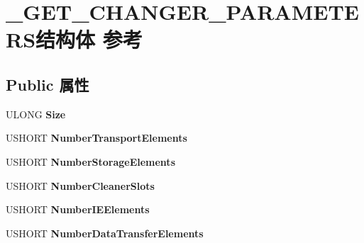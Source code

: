 \hypertarget{struct___g_e_t___c_h_a_n_g_e_r___p_a_r_a_m_e_t_e_r_s}{}\section{\+\_\+\+G\+E\+T\+\_\+\+C\+H\+A\+N\+G\+E\+R\+\_\+\+P\+A\+R\+A\+M\+E\+T\+E\+R\+S结构体 参考}
\label{struct___g_e_t___c_h_a_n_g_e_r___p_a_r_a_m_e_t_e_r_s}
\subsection*{Public 属性}
\begin{DoxyCompactItemize}
\item 
\mbox{\label{struct___g_e_t___c_h_a_n_g_e_r___p_a_r_a_m_e_t_e_r_s_ab5131bb9461a21d3741fcdb5f977db70}} 
U\+L\+O\+NG {\bfseries Size}
\item 
\mbox{\label{struct___g_e_t___c_h_a_n_g_e_r___p_a_r_a_m_e_t_e_r_s_a207c63d0f44720045bf9cbad894b8180}} 
U\+S\+H\+O\+RT {\bfseries Number\+Transport\+Elements}
\item 
\mbox{\label{struct___g_e_t___c_h_a_n_g_e_r___p_a_r_a_m_e_t_e_r_s_a2f4b00d40889e4919d5c775a566260b2}} 
U\+S\+H\+O\+RT {\bfseries Number\+Storage\+Elements}
\item 
\mbox{\label{struct___g_e_t___c_h_a_n_g_e_r___p_a_r_a_m_e_t_e_r_s_ac7c03ddf226e5ddf21e4d95164ea8a73}} 
U\+S\+H\+O\+RT {\bfseries Number\+Cleaner\+Slots}
\item 
\mbox{\label{struct___g_e_t___c_h_a_n_g_e_r___p_a_r_a_m_e_t_e_r_s_a09a519aed8e7740dd4c3f2535f61c44e}} 
U\+S\+H\+O\+RT {\bfseries Number\+I\+E\+Elements}
\item 
\mbox{\label{struct___g_e_t___c_h_a_n_g_e_r___p_a_r_a_m_e_t_e_r_s_aaabc74d1b08fbf54e0178b9cb74902a0}} 
U\+S\+H\+O\+RT {\bfseries Number\+Data\+Transfer\+Elements}

\end{DoxyCompactItemize}
